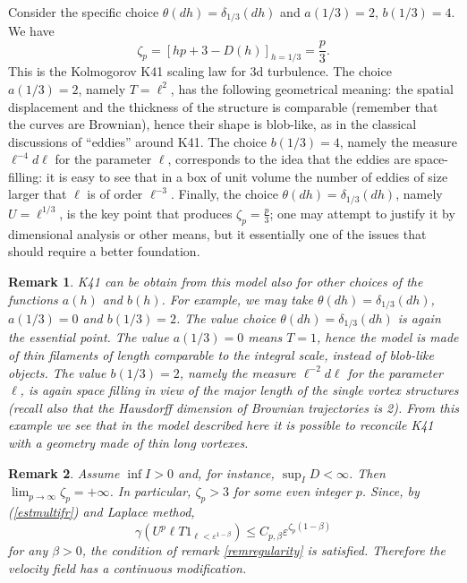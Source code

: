 \documentclass[a4paper,12pt]{article}
\newtheorem{remark}{Remark}
\begin{document}
Consider the specific choice $\theta(dh)=\delta_{1/3}(dh)$ and $a(1/3)=2$,
$b(1/3)=4$. We have
\[
\zeta_{p}=[hp+3-D(h)]_{h=1/3}=\frac{p}{3}.
\]
This is the Kolmogorov K41 scaling law for 3d turbulence. The choice $a(1/3)=2
$, namely $T=\ell^{2}$, has the following geometrical meaning: the spatial
displacement and the thickness of the structure is comparable (remember that
the curves are Brownian), hence their shape is blob-like, as in the classical
discussions of ``eddies'' around K41. The choice $b(1/3)=4$, namely the
measure $\ell^{-4}d\ell$ for the parameter $\ell$, corresponds to the idea
that the eddies are space-filling: it is easy to see that in a box of unit
volume the number of eddies of size larger that $\ell$ is of order $\ell^{-3}%
$. Finally, the choice $\theta(dh)=\delta_{1/3}(dh)$, namely $U=\ell^{1/3}$,
is the key point that produces $\zeta_{p}=\frac{p}{3}$; one may attempt to
justify it by dimensional analysis or other means, but it essentially one of
the issues that should require a better foundation.

\begin{remark}
K41 can be obtain from this model also for other choices of the functions
$a(h)$ and $b(h)$. For example, we may take $\theta(dh)=\delta_{1/3}(dh)$,
$a(1/3)=0$ and $b(1/3)=2$. The value choice $\theta(dh)=\delta_{1/3}(dh)$ is
again the essential point. The value $a(1/3)=0$ means $T=1$, hence the model
is made of thin filaments of length comparable to the integral scale, instead
of blob-like objects. The value $b(1/3)=2$, namely the measure $\ell^{-2}%
d\ell$ for the parameter $\ell$, is again space filling in view of the major
length of the single vortex structures (recall also that the Hausdorff
dimension of Brownian trajectories is 2). From this example we see that in the
model described here it is possible to reconcile K41 with a geometry made of
thin long vortexes.
\end{remark}

\begin{remark}
\label{remmultmodif}Assume $\inf I>0$ and, for instance, $\sup_{I}D<\infty$.
Then $\lim_{p\rightarrow\infty}\zeta_{p}=+\infty$. In particular, $\zeta
_{p}>3$ for some even integer $p$. Since, by (\ref{estmultifr}) and Laplace
method,
\[
\gamma(U^{p}\ell T1_{\ell<\varepsilon^{1-\beta}})\leq C_{p,\beta}%
\varepsilon^{\zeta_{p}\left(  1-\beta\right)  }%
\]
for any $\beta>0$, the condition of remark \ref{remregularity} is satisfied.
Therefore the velocity field has a continuous modification.
\end{remark}
\end{document}
